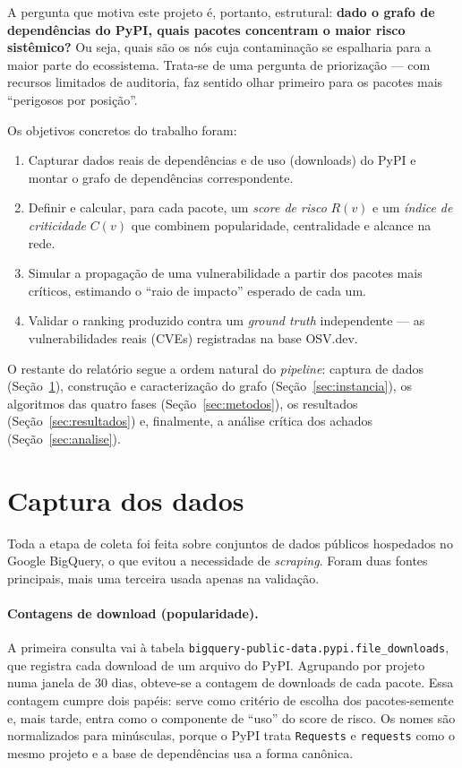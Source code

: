 \documentclass[11pt,a4paper]{article}
\begin{document}
A pergunta que motiva este projeto é, portanto, estrutural: \textbf{dado o grafo de
dependências do PyPI, quais pacotes concentram o maior risco sistêmico?} Ou seja,
quais são os nós cuja contaminação se espalharia para a maior parte do ecossistema.
Trata-se de uma pergunta de priorização --- com recursos limitados de auditoria,
faz sentido olhar primeiro para os pacotes mais ``perigosos por posição''.

Os objetivos concretos do trabalho foram:

\begin{enumerate}\setlength\itemsep{1pt}
  \item Capturar dados reais de dependências e de uso (downloads) do PyPI e montar
        o grafo de dependências correspondente.
  \item Definir e calcular, para cada pacote, um \emph{score de risco} $R(v)$ e um
        \emph{índice de criticidade} $C(v)$ que combinem popularidade, centralidade
        e alcance na rede.
  \item Simular a propagação de uma vulnerabilidade a partir dos pacotes mais
        críticos, estimando o ``raio de impacto'' esperado de cada um.
  \item Validar o ranking produzido contra um \emph{ground truth} independente ---
        as vulnerabilidades reais (CVEs) registradas na base OSV.dev.
\end{enumerate}

O restante do relatório segue a ordem natural do \emph{pipeline}:
captura de dados (Seção~\ref{sec:dados}), construção e caracterização do grafo
(Seção~\ref{sec:instancia}), os algoritmos das quatro fases (Seção~\ref{sec:metodos}),
os resultados (Seção~\ref{sec:resultados}) e, finalmente, a análise crítica dos
achados (Seção~\ref{sec:analise}).

\section{Captura dos dados}\label{sec:dados}

Toda a etapa de coleta foi feita sobre conjuntos de dados públicos hospedados no
Google BigQuery, o que evitou a necessidade de \emph{scraping}. Foram duas fontes principais, mais uma terceira usada apenas na
validação.

\paragraph{Contagens de download (popularidade).}
A primeira consulta vai à tabela \texttt{bigquery-public-data.pypi.file\_downloads},
que registra cada download de um arquivo do PyPI. Agrupando por projeto numa janela
de 30 dias, obteve-se a contagem de downloads de cada pacote. Essa contagem cumpre
dois papéis: serve como critério de escolha dos pacotes-semente e, mais tarde, entra como o
componente de ``uso'' do score de risco. Os nomes são normalizados para
minúsculas, porque o PyPI trata \texttt{Requests} e \texttt{requests} como o mesmo
projeto e a base de dependências usa a forma canônica.
\end{document}
